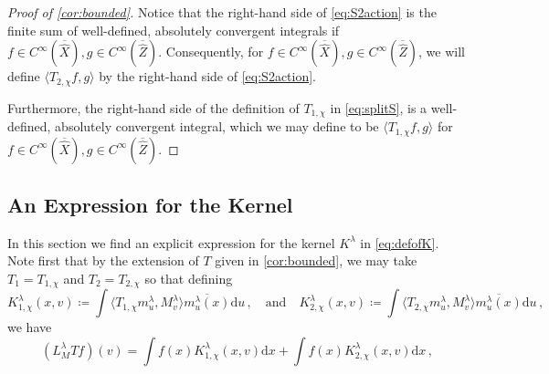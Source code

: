 \documentclass[
	fontsize=11pt, 
	twoside=false, 
	abstract=true, 
	a4paper,
]{scrartcl}
\newcommand{\dd}{\mathrm{d}}
\newcommand{\abs}[1]{\left\lvert#1\right\rvert}
\newcommand{\del}{\partial}
\newcommand{\an}{\quad\text{and}\quad}
\begin{document}
\begin{proof}[Proof of \cref{cor:bounded}]
	Notice that the right-hand side of \cref{eq:S2action} is the finite sum of well-defined, absolutely convergent integrals if $f\in C^\infty(\overline{\hat X}), g\in C^\infty(\overline{\hat Z})$. Consequently, for $f\in C^\infty(\overline{\hat X}), g\in C^\infty(\overline{\hat Z})$, we will define $\langle T_{2,\chi}f,g\rangle$ by the right-hand side of \cref{eq:S2action}.

	Furthermore, the right-hand side of the definition of $T_{1,\chi}$ in \cref{eq:splitS},
	is a well-defined, absolutely convergent integral, which we may define to be $\langle T_{1,\chi}f,g\rangle$ for $f\in C^\infty(\overline{\hat X}), g\in C^\infty(\overline{\hat Z})$.
\end{proof}


\subsection{An Expression for the Kernel}\label{sec:kernel}

In this section we find an explicit expression for the kernel $K^\lambda$ in \cref{eq:defofK}. Note first that by the extension of $T$ given in \cref{cor:bounded}, we may take $T_1 = T_{1,\chi}$ and $T_2 = T_{2,\chi}$ so that defining
\begin{equation}\label{eq:defineK1K2}
	K_{1,\chi}^\lambda(x,v) \coloneqq \int \langle T_{1,\chi}m_u^\lambda, M_v^\lambda\rangle \overline{m_u^\lambda(x)}\dd u\,,\an  K_{2,\chi}^\lambda(x,v)\coloneqq \int \langle T_{2,\chi} m_u^\lambda, M_v^\lambda\rangle \overline{m_u^\lambda(x)}\dd u\,,
\end{equation}
we have
\[
	(L_M^\lambda T f)(v) = \int f(x)K_{1,\chi}^\lambda(x,v)\dd x + \int f(x)K_{2,\chi}^\lambda(x,v)\dd x\,,
\]
\end{document}
